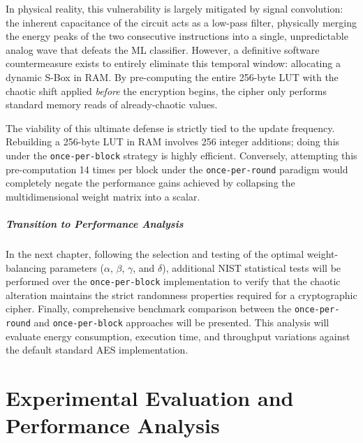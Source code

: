 \documentclass[11pt,a4paper]{report}
\begin{document}
In physical reality, this vulnerability is largely mitigated by signal convolution: the inherent capacitance of the circuit acts as a low-pass filter, physically merging the energy peaks of the two consecutive instructions into a single, unpredictable analog wave that defeats the ML classifier. 
However, a definitive software countermeasure exists to entirely eliminate this temporal window: allocating a dynamic S-Box in RAM. 
By pre-computing the entire 256-byte LUT with the chaotic shift applied \textit{before} the encryption begins, the cipher only performs standard memory reads of already-chaotic values.

The viability of this ultimate defense is strictly tied to the update frequency. Rebuilding a 256-byte LUT in RAM involves 256 integer additions; doing this under the \texttt{once-per-block} strategy is highly efficient. 
Conversely, attempting this pre-computation 14 times per block under the \texttt{once-per-round} paradigm would completely negate the performance gains achieved by collapsing the multidimensional weight matrix into a scalar.

\paragraph{Transition to Performance Analysis}
In the next chapter, following the selection and testing of the optimal weight-balancing parameters ($\alpha$, $\beta$, $\gamma$, and $\delta$), 
additional NIST statistical tests will be performed over the \texttt{once-per-block} implementation to verify that the chaotic alteration maintains the strict randomness properties required for a cryptographic cipher.
Finally, comprehensive benchmark comparison between the \texttt{once-per-round} and \texttt{once-per-block} approaches will be presented. 
This analysis will evaluate energy consumption, execution time, and throughput variations against the default standard AES implementation. 
 





\chapter[Experimental Evaluation and Performance Analysis]{Experimental Evaluation and \\ Performance Analysis}
\end{document}

